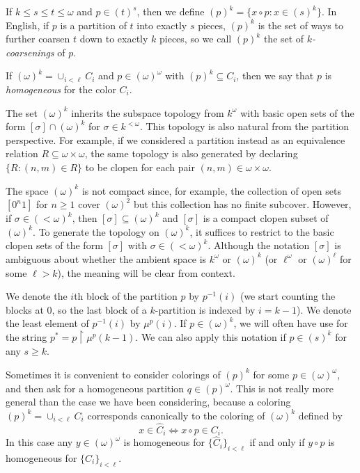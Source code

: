 \documentclass{amsart}
\theoremstyle{definition}
\theoremstyle{remark}
\newcommand{\restrict}{\upharpoonright}
\newcommand{\block}[2]{{#1}^{-1}(#2)}
\begin{document}
If $k \leq s \leq t \leq \omega$ and $p \in (t)^s$, then we define
$(p)^k = \{x \circ p  : x \in (s)^k\}$.  In English, if $p$ is a partition of $t$ 
into exactly $s$ pieces, $(p)^k$ is the set of ways to further coarsen 
$t$ down to exactly $k$ pieces, so we call $(p)^k$ the set of 
\emph{$k$-coarsenings} of $p$.

If $(\omega)^k = \cup_{i<\ell} C_i$ and $p \in (\omega)^\omega$ 
with $(p)^k \subseteq C_i$, then we say that $p$ is \emph{homogeneous}
for the color $C_i$.

The set $(\omega)^k$ inherits the subspace topology from
$k^{\omega}$ with basic open sets of the form $[\sigma] \cap (\omega)^k$ for $\sigma \in k^{< \omega}$.   This topology is also natural
from the partition perspective.  For example, 
if we considered a partition instead as an equivalence
relation $R\subseteq \omega\times\omega$, the same topology is also
generated by declaring $\{R : (n,m)\in R\}$ to be clopen for each pair $(n,m) \in \omega\times\omega$.

The space $(\omega)^k$ is not compact since, for example, 
the collection of open sets $[0^n1]$ for $n \geq 1$ cover $(\omega)^2$ but this collection has no finite subcover. However, if $\sigma \in (<\omega)^k$, then 
$[\sigma] \subseteq (\omega)^k$ and $[\sigma]$ is a compact clopen subset of $(\omega)^k$. To generate the topology on $(\omega)^k$, it suffices to restrict to 
the basic clopen sets of the form $[\sigma]$ with $\sigma \in (<\omega)^k$.  Although the
notation $[\sigma]$ is ambiguous about whether the ambient space is $k^{\omega}$ or $(\omega)^k$ (or $\ell^{\omega}$ or $(\omega)^\ell$ for some $\ell > k$), 
the meaning will be clear from context.

We denote the $i$th block of the partition $p$ by $\block{p}{i}$  (we start 
counting the blocks at 0, so the last block of a $k$-partition is indexed 
by $i=k-1$).  We denote the least element of $\block{p}{i}$ by 
$\mu^p(i)$.  If $p \in (\omega)^k$,
 we will often have use for the 
string $p^\ast = p\restrict\mu^p(k-1)$.
We can also apply this notation if $p \in (s)^k$ for any $s \geq k$.

Sometimes it is convenient to consider colorings of $(p)^k$ 
for some $p \in (\omega)^\omega$, and then ask for 
a homogeneous partition $q \in (p)^\omega$.  This is 
not really more general than the case we have been considering,
because a coloring
$(p)^k = \cup_{i<\ell} C_i$ corresponds canonically 
to the coloring of $(\omega)^k$ defined by
\begin{equation}\label{eqn:canonical}
x \in \widehat C_i \iff x \circ p \in C_i.
\end{equation}
In this case any $y\in (\omega)^\omega$ is homogeneous 
for $\{\widehat C_i\}_{i<\ell}$ if and only if $y \circ p$ 
is homogeneous for $\{C_i\}_{i<\ell}$. 
\end{document}
